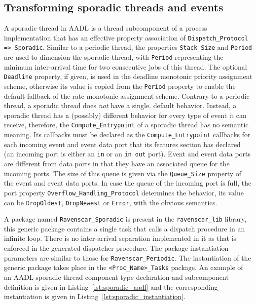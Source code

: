 \subsection{Transforming sporadic threads and events}
A sporadic thread in AADL is a thread subcomponent of a process
implementation that has an effective property association of
\texttt{Dispatch\_Protocol => Sporadic}. Similar to a periodic thread,
the properties \texttt{Stack\_Size} and \texttt{Period} are used to
dimension the sporadic thread, with \texttt{Period} representing the
minimum inter-arrival time for two consecutive jobs of this
thread. The optional \texttt{Deadline} property, if given, is used in
the deadline monotonic priority assignment scheme, otherwise its value
is copied from the \texttt{Period} property to enable the default
fallback of the rate monotonic assignment scheme. Contrary to a
periodic thread, a sporadic thread does \emph{not} have a single,
default behavior. Instead, a sporadic thread has a (possibly)
different behavior for every type of event it can receive, therefore,
the \texttt{Compute\_Entrypoint} of a sporadic thread has no semantic
meaning. Its callbacks must be declared as the
\texttt{Compute\_Entrypoint} callbacks for each incoming event and
event data port that its features section has declared (an incoming
port is either an \texttt{in} or an \texttt{in out} port). Event and
event data ports are different from data ports in that they have an
associated queue for the incoming ports. The size of this queue is
given via the \texttt{Queue\_Size} property of the event and event
data ports. In case the queue of the incoming port is full, the port
property \texttt{Overflow\_Handling\_Protocol} determines the
behavior, its value can be \texttt{DropOldest}, \texttt{DropNewest} or
\texttt{Error}, with the obvious semantics.

A package named \texttt{Ravenscar\_Sporadic} is present in the
\texttt{ravenscar\_lib} library, this generic package contains a
single task that calls a dispatch procedure in an infinite loop. There
is no inter-arrival separation implemented in it as that is enforced
in the generated dispatcher procedure. The package instantiation
parameters are similar to those for \texttt{Ravenscar\_Periodic}. The
instantiation of the generic package takes place in the
\texttt{<Proc\_Name>\_Tasks} package. An example of an AADL sporadic
thread component type declaration and subcomponent definition is given
in Listing~\ref{lst:sporadic_aadl} and the corresponding instantiation
is given in Listing~\ref{lst:sporadic_instantiation}.


